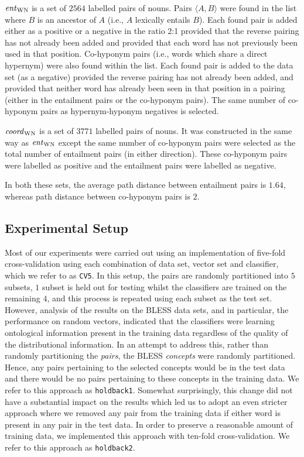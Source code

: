\documentclass[11pt]{article}
\newcommand\entWN{\mbox{\em ent\/}_{\mbox{\scriptsize WN}}}
\newcommand\coordWN{\mbox{\em coord\/}_{\mbox{\scriptsize WN}}}
\begin{document}
\smallskip

$\entWN$ is a set of $2564$ labelled pairs of nouns.  Pairs $\langle A,B\rangle$ were found in the list where $B$ is an ancestor of $A$ (i.e., $A$ lexically entails $B$).  Each found pair is added either as a positive or a negative in the ratio 2:1 provided that the reverse pairing has not already been added and provided that each word has not previously been used in that position.  Co-hyponym pairs (i.e., words which share a direct hypernym) were also found within the list.  Each found pair is added to the data set (as a negative) provided the reverse pairing has not already been added, and provided that neither word has already been seen in that position in a pairing (either in the entailment pairs or the co-hyponym pairs).  The same number of co-hyponym pairs as hypernym-hyponym negatives is selected. 

\smallskip

$\coordWN$ is a set of $3771$ labelled pairs of nouns.  It was constructed in the same way as $\entWN$ except the same number of co-hyponym pairs were selected as the total number of entailment pairs (in either direction).  These co-hyponym pairs were labelled as positive and the entailment pairs were labelled as negative.

\smallskip

In both these sets, the average path distance between entailment pairs is $1.64$, whereas path distance between co-hyponym pairs is $2$.

\subsection{Experimental Setup}

Most of our experiments were carried out using an implementation of five-fold cross-validation using each combination of data set, vector set and classifier, which we refer to as \texttt{CV5}.  In this setup, the pairs are randomly partitioned into $5$ subsets, $1$ subset is held out for testing whilst the classifiers are trained on the remaining $4$, and this process is repeated using each subset as the test set.  However,  analysis of the results on the BLESS data sets, and in particular, the performance on random vectors, indicated that the classifiers were learning ontological information present in the training data regardless of the quality of the distributional information.  In an attempt to address this, rather than randomly partitioning the \emph{pairs}, the BLESS \emph{concepts} were randomly partitioned.  Hence, any pairs pertaining to the selected concepts would be in the test data and there would be no pairs pertaining to these concepts in the training data.  We refer to this approach as \texttt{holdback1}.  Somewhat surprisingly, this change did not have a substantial impact on the results which led us to adopt an even stricter approach where we removed any pair from the training data if either word is present in any pair in the test data.  In order to preserve a reasonable amount of training data, we implemented this approach with ten-fold cross-validation.  We refer to this approach as \texttt{holdback2}.
\end{document}
